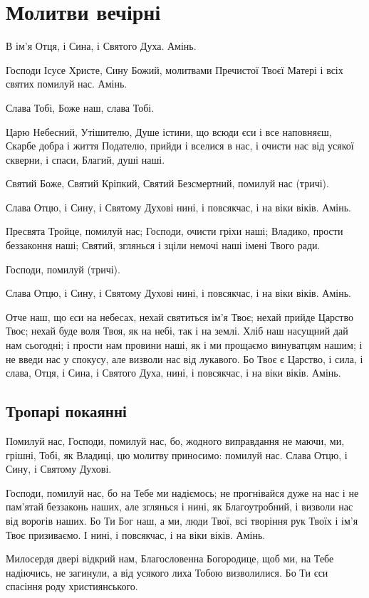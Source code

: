 \documentclass[chapters.tex]{subfiles}
\begin{document}
\chapter{Молитви вечірні}
В ім’я Отця, і Сина, і Святого Духа. Амінь.

Господи Ісусе Христе, Сину Божий, молитвами Пречистої Твоєї Матері і всіх святих помилуй нас. Амінь.

Слава Тобі, Боже наш, слава Тобі.

Царю Небесний, Утішителю, Душе істини, що всюди єси і все наповняєш, Скарбе добра і життя Подателю, прийди і вселися в нас, і очисти нас від усякої скверни, і спаси, Благий, душі наші.

Святий Боже, Святий Кріпкий, Святий Безсмертний, помилуй нас (тричі).

Слава Отцю, і Сину, і Святому Духові нині, і повсякчас, і на віки віків. Амінь.

Пресвята Тройце, помилуй нас; Господи, очисти гріхи наші; Владико, прости беззаконня наші; Святий, зглянься і зціли немочі наші імені Твого ради.

Господи, помилуй (тричі).

Слава Отцю, і Сину, і Святому Духові нині, і повсякчас, і на віки віків. Амінь.

Отче наш, що єси на небесах, нехай святиться ім’я Твоє; нехай прийде Царство Твоє; нехай буде воля Твоя, як на небі, так і на землі. Хліб наш насущний дай нам сьогодні; і прости нам провини наші, як і ми прощаємо винуватцям нашим; і не введи нас у спокусу, але визволи нас від лукавого. Бо Твоє є Царство, і сила, і слава, Отця, і Сина, і Святого Духа, нині, і повсякчас, і на віки віків. Амінь.

\section{Тропарі покаянні}
Помилуй нас, Господи, помилуй нас, бо, жодного виправдання не маючи, ми, грішні, Тобі, як Владиці, цю молитву приносимо: помилуй нас. Слава Отцю, і Сину, і Святому Духові.

Господи, помилуй нас, бо на Тебе ми надіємось; не прогнівайся дуже на нас і не пам’ятай беззаконь наших, але зглянься і нині, як Благоутробний, і визволи нас від ворогів наших. Бо Ти Бог наш, а ми, люди Твої, всі творіння рук Твоїх і ім’я Твоє призиваємо. І нині, і повсякчас, і на віки віків. Амінь.

Милосердя двері відкрий нам, Благословенна Богородице, щоб ми, на Тебе надіючись, не загинули, а від усякого лиха Тобою визволилися. Бо Ти єси спасіння роду християнського.
\end{document}
